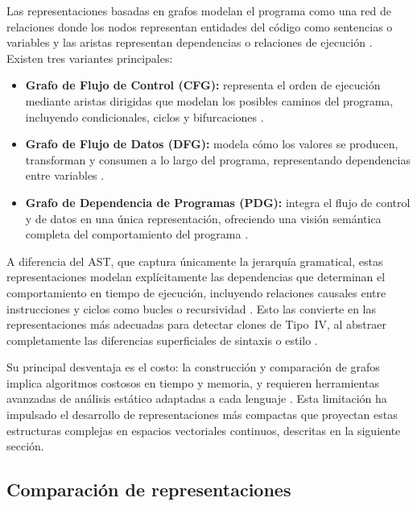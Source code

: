 Las representaciones basadas en grafos modelan el programa como una red 
de relaciones donde los nodos representan entidades del código como sentencias 
o variables y las aristas representan dependencias o relaciones de 
ejecución \cite{Yu2023Graph}. Existen tres variantes principales:

\begin{itemize}
    \item \textbf{Grafo de Flujo de Control (CFG):} representa el orden 
    de ejecución mediante aristas dirigidas que modelan los posibles 
    caminos del programa, incluyendo condicionales, ciclos y bifurcaciones 
    \cite{Yu2023Graph}.

    \item \textbf{Grafo de Flujo de Datos (DFG):} modela cómo los valores 
    se producen, transforman y consumen a lo largo del programa, 
    representando dependencias entre variables \cite{Guo2021GraphCodeBERT}.

    \item \textbf{Grafo de Dependencia de Programas (PDG):} integra el 
    flujo de control y de datos en una única representación, ofreciendo 
    una visión semántica completa del comportamiento del programa 
    \cite{Yu2023Graph}.
\end{itemize}

A diferencia del AST, que captura únicamente la jerarquía gramatical, 
estas representaciones modelan explícitamente las dependencias que 
determinan el comportamiento en tiempo de ejecución, incluyendo relaciones 
causales entre instrucciones y ciclos como bucles o recursividad 
\cite{Lu2026CSSG}. Esto las convierte en las representaciones más 
adecuadas para detectar clones de Tipo~IV, al abstraer completamente 
las diferencias superficiales de sintaxis o estilo 
\cite{Yu2023Graph, Guo2021GraphCodeBERT}.

Su principal desventaja es el costo: la construcción y comparación de 
grafos implica algoritmos costosos en tiempo y memoria, y requieren 
herramientas avanzadas de análisis estático adaptadas a cada lenguaje 
\cite{Yu2023Graph}. Esta limitación ha impulsado el desarrollo de 
representaciones más compactas que proyectan estas estructuras complejas 
en espacios vectoriales continuos, descritas en la siguiente sección.

\subsection{Comparación de representaciones}

